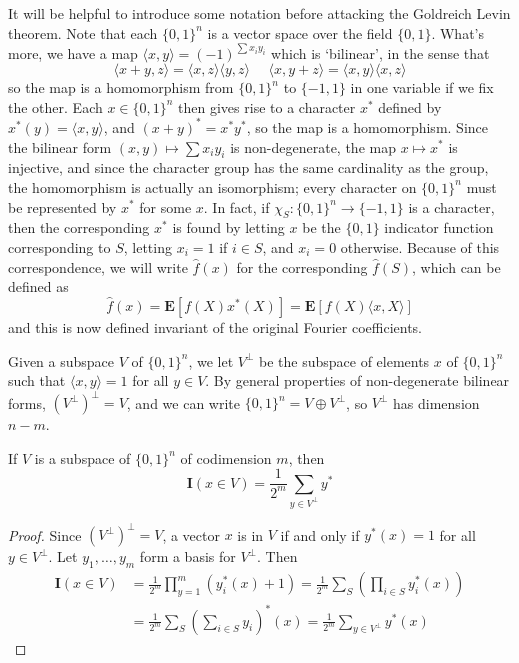 It will be helpful to introduce some notation before attacking the Goldreich Levin theorem. Note that each $\{ 0, 1 \}^n$ is a vector space over the field $\{ 0, 1 \}$. What's more, we have a map $\langle x, y \rangle = (-1)^{\sum x_i y_i}$ which is `bilinear', in the sense that
%
\[ \langle x + y, z \rangle = \langle x,z \rangle \langle y, z \rangle\ \ \ \ \ \ \langle x, y + z \rangle = \langle x, y \rangle \langle x, z \rangle \]
%
so the map is a homomorphism from $\{ 0, 1 \}^n$ to $\{ -1, 1 \}$ in one variable if we fix the other. Each $x \in \{ 0, 1 \}^n$ then gives rise to a character $x^*$ defined by $x^*(y) = \langle x, y \rangle$, and $(x + y)^* = x^* y^*$, so the map is a homomorphism. Since the bilinear form $(x,y) \mapsto \sum x_i y_i$ is non-degenerate, the map $x \mapsto x^*$ is injective, and since the character group has the same cardinality as the group, the homomorphism is actually an isomorphism; every character on $\{ 0, 1 \}^n$ must be represented by $x^*$ for some $x$. In fact, if $\chi_S: \{ 0, 1 \}^n \to \{ -1, 1 \}$ is a character, then the corresponding $x^*$ is found by letting $x$ be the $\{ 0, 1 \}$ indicator function corresponding to $S$, letting $x_i = 1$ if $i \in S$, and $x_i = 0$ otherwise. Because of this correspondence, we will write $\widehat{f}(x)$ for the corresponding $\widehat{f}(S)$, which can be defined as
%
\[ \widehat{f}(x) = \mathbf{E}[f(X)x^*(X)] = \mathbf{E}[f(X) \langle x, X \rangle] \]
%
and this is now defined invariant of the original Fourier coefficients.

Given a subspace $V$ of $\{ 0, 1 \}^n$, we let $V^\perp$ be the subspace of elements $x$ of $\{ 0, 1 \}^n$ such that $\langle x, y \rangle = 1$ for all $y \in V$. By general properties of non-degenerate bilinear forms, $(V^\perp)^\perp = V$, and we can write $\{ 0, 1 \}^n = V \oplus V^\perp$, so $V^\perp$ has dimension $n - m$.

\begin{theorem}
    If $V$ is a subspace of $\{ 0, 1 \}^n$ of codimension $m$, then
    \[ \mathbf{I}(x \in V) = \frac{1}{2^m} \sum_{y \in V^\perp} y^* \]
\end{theorem}
\begin{proof}
    Since $(V^\perp)^\perp = V$, a vector $x$ is in $V$ if and only if $y^*(x) = 1$ for all $y \in V^\perp$. Let $y_1, \dots, y_m$ form a basis for $V^\perp$. Then
    \begin{align*}
        \mathbf{I}(x \in V) &= \frac{1}{2^m} \prod_{y = 1}^m \left( y_i^*(x) + 1 \right) = \frac{1}{2^m} \sum_S \left( \prod_{i \in S} y_i^*(x) \right)\\
        &= \frac{1}{2^m} \sum_S \left( \sum_{i \in S} y_i \right)^*(x) = \frac{1}{2^m} \sum_{y \in V^\perp} y^*(x)
    \end{align*}
\end{proof}


